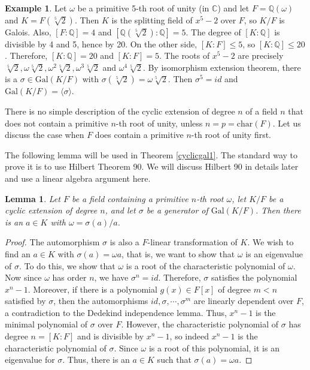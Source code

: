 \documentclass[12pt]{report}
\newtheorem{lemma}[theorem]{Lemma}
\theoremstyle{definition}
\newtheorem{example}[theorem]{Example}
\newcommand{\charr}{\text{char}}
\newcommand{\Gal}{\text{Gal}}
\newcommand{\CC}{\mathbb{C}}
\newcommand{\QQ}{\mathbb{Q}}
\begin{document}
\begin{example}
	Let $\omega$ be a primitive 5-th root of unity (in $\CC$) and let $F=\QQ(\omega)$ and $K=F(\sqrt[5]{2})$. Then $K$ is the splitting field of $x^5-2$ over $F$, so $K/F$ is Galois. Also, $[F:\QQ]=4$ and $[\QQ(\sqrt[5]{2}):\QQ]=5$. The degree of $[K:\QQ]$ is divisible by 4 and 5, hence by 20. On the other side, $[K:F]\leq 5$, so $[K:\QQ]\leq 20$. Therefore, $[K:\QQ]=20$ and $[K:F]=5$. The roots of $x^5-2$ are precisely $\sqrt[5]{2},\omega\sqrt[5]{2},\omega^2\sqrt[5]{2},\omega^3\sqrt[5]{2}$ and $\omega^4\sqrt[5]{2}$. By isomorphism extension theorem, there is a $\sigma\in \Gal(K/F)$ with $\sigma(\sqrt[5]{2})=\omega \sqrt[5]{2}$. Then $\sigma^5=id$ and $\Gal(K/F)=\langle \sigma\rangle$.
\end{example}

There is no simple description of the cyclic extension of degree $n$ of a field $n$ that does not contain a primitive $n$-th root of unity, unless $n=p=\charr(F)$. Let us discuss the case when $F$ does contain a primitive $n$-th root of unity first.

The following lemma will be used in Theorem \ref{cyclicgal1}. The standard way to prove it is to use Hilbert Theorem 90. We will discuss Hilbert 90  in details later and use a linear algebra argument here.

\begin{lemma}\label{cycliclem1}
	Let $F$ be a field containing a primitive $n$-th root $\omega$, let $K/F$ be a cyclic extension of degree $n$, and let $\sigma$ be a generator of $\Gal(K/F)$. Then there is an $a\in K$ with $\omega=\sigma(a)/a$.
\end{lemma}
\begin{proof}
	The automorphism $\sigma$ is also a $F$-linear transformation of $K$. We wish to find an $a\in K$ with $\sigma(a)=\omega a$, that is, we want to show that $\omega$ is an eigenvalue of $\sigma$. To do this, we show that $\omega$ is a root of the characteristic polynomial of $\omega$. Now since $\omega$ has order $n$, we have $\sigma^n=id$. Therefore, $\sigma$ satisfies the polynomial $x^n-1$. Moreover, if there is a polynomial $g(x)\in F[x]$ of degree $m<n$ satisfied by $\sigma$, then the automorphisms $id,\sigma,\cdots,\sigma^{m}$ are linearly dependent over $F$, a contradiction to the Dedekind independence lemma. Thus, $x^n-1$ is the minimal polynomial of $\sigma$ over $F$. However, the characteristic polynomial of $\sigma$ has degree $n=[K:F]$ and is divisible by $x^n-1$, so indeed $x^n-1$ is the characteristic polynomial of $\sigma$. Since $\omega$ is a root of this polynomial, it is an eigenvalue for $\sigma$. Thus, there is an $a\in K$ such that $\sigma(a)=\omega a$.
\end{proof}
\end{document}
